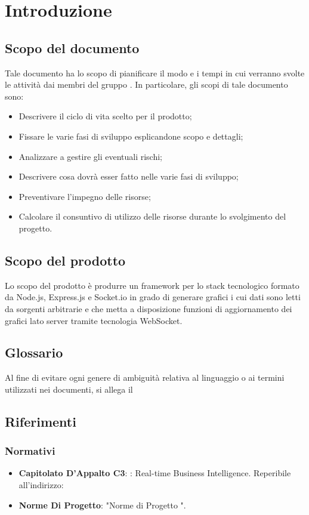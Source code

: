 \section{Introduzione}
	\subsection{Scopo del documento}
		Tale documento ha lo scopo di pianificare il modo e i tempi in cui verranno svolte le attività dai membri del gruppo \groupname.
		In particolare, gli scopi di tale documento sono:
		\begin{itemize}
			\item Descrivere il ciclo di vita scelto per il prodotto;
			\item Fissare le varie fasi di sviluppo esplicandone scopo e dettagli;
			\item Analizzare a gestire gli eventuali rischi;
			\item Descrivere cosa dovrà esser fatto nelle varie fasi di sviluppo;
			\item Preventivare l'impegno delle risorse;
			\item Calcolare il consuntivo di utilizzo delle risorse durante lo svolgimento del progetto.
		\end{itemize}
	\subsection{Scopo del prodotto}
		Lo scopo del prodotto è produrre un framework per lo stack tecnologico formato da Node.js, Express.js e Socket.io in grado di generare grafici i cui dati sono letti da sorgenti arbitrarie e che metta a disposizione funzioni di aggiornamento dei grafici lato server tramite tecnologia WebSocket.
	\subsection{Glossario}
		Al fine di evitare ogni genere di ambiguità relativa al linguaggio o ai termini utilizzati nei documenti, si allega il 
	\subsection{Riferimenti}
		\subsubsection{Normativi}
			\begin{itemize}
				\item\textbf{Capitolato D'Appalto C3}: \projectname: Real-time Business Intelligence. Reperibile all'indirizzo: 
				\item\textbf{Norme Di Progetto}: "Norme di Progetto \lastversion".
			\end{itemize}
